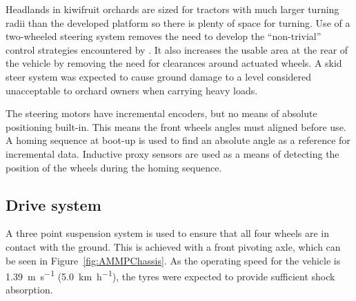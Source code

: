 \documentclass[preprint,authoryear,12pt]{elsarticle}
\begin{document}
        Headlands in kiwifruit orchards are sized for tractors with much larger turning radii than the developed platform so there is plenty of space for turning.
        Use of a two-wheeled steering system removes the need to develop the ``non-trivial'' control strategies encountered by \cite{Bak2004}.
        It also increases the usable area at the rear of the vehicle by removing the need for clearances around actuated wheels.
        A skid steer system was expected to cause ground damage to a level considered unacceptable to orchard owners when carrying heavy loads.

        The steering motors have incremental encoders, but no means of absolute positioning built-in.
        This means the front wheels angles must aligned before use.
        A homing sequence at boot-up is used to find an absolute angle as a reference for incremental data.
        Inductive proxy sensors are used as a means of detecting the position of the wheels during the homing sequence.

    \subsection{Drive system}
    \label{sub:drive}

        A three point suspension system is used to ensure that all four wheels are in contact with the ground.
        This is achieved with a front pivoting axle, which can be seen in  Figure~\ref{fig:AMMPChassis}.
        As the operating speed for the vehicle is \SI{1.39}{\meter\per\second} (\SI{5.0}{\kilo\meter\per\hour}), the tyres were expected to provide sufficient shock absorption.

\end{document}
